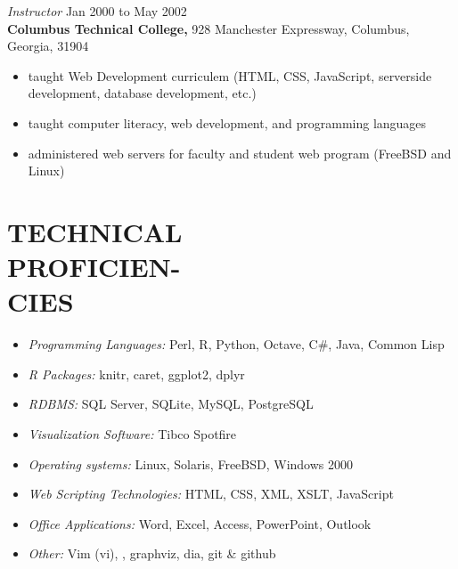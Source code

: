 \documentclass[margin, 10pt]{res} %
\begin{document}
\begin{resume}

{\it Instructor} \hfill Jan 2000 to May 2002 \\
\textbf{Columbus Technical College,} 928 Manchester Expressway, Columbus, Georgia, 31904

\begin{itemize} \itemsep -2pt %
        \item taught Web Development curriculem (HTML, CSS, JavaScript, serverside development, database development, etc.)
\item taught computer literacy, web development, and programming languages
\item administered web servers for faculty and student web program (FreeBSD and Linux)
\end{itemize}


\section{TECHNICAL\\ PROFICIEN-\\ CIES}

\begin{itemize} \itemsep -2pt %

\item {\it Programming Languages:} Perl, \textsf{R}, Python, Octave, C\#, Java, Common Lisp
\item {\it \textsf{R} Packages:} knitr, caret, ggplot2, dplyr
\item {\it RDBMS:} SQL Server, SQLite, MySQL, PostgreSQL
\item {\it Visualization Software:} Tibco Spotfire
\item {\it Operating systems:} Linux, Solaris, FreeBSD, Windows 2000
\item {\it Web Scripting Technologies:} HTML, CSS, XML, XSLT, JavaScript
\item {\it Office Applications:} Word, Excel, Access, PowerPoint, Outlook
\item {\it Other:} Vim (vi), \LaTeXe, graphviz, dia, git \& github
\end{itemize}


\end{resume}
\end{document}
